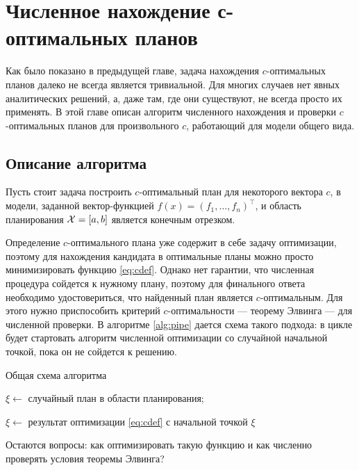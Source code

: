 \documentclass[specialist,
               substylefile = spbu.rtx,
               subf,href,colorlinks=true, 12pt]{disser}
\theoremstyle{definition}
\newcommand{\hm}[1]{#1\nobreak\discretionary{}{\hbox{\ensuremath{#1}}}{}}
\begin{document}
	
\chapter{Численное нахождение с-оптимальных планов}
\label{ch:num}
	Как было показано в предыдущей главе, задача нахождения $c$-оптимальных планов далеко не всегда является тривиальной. Для многих случаев нет явных аналитических решений, а, даже там, где они существуют, не всегда просто их применять. В этой главе описан алгоритм численного нахождения и проверки $c$-оптимальных планов для произвольного $c$, работающий для модели общего вида.
	\section{Описание алгоритма}
	Пусть стоит задача построить $c$-оптимальный план для некоторого вектора $c$, в модели, заданной вектор-функцией $f(x) = (f_1, \ldots, f_n)^\top$, и область планирования $\mathcal{X} \hm{=} [a, b]$ является конечным отрезком.
	
	Определение $c$-оптимального плана уже содержит в себе задачу оптимизации, поэтому для нахождения кандидата в оптимальные планы можно просто минимизировать функцию \eqref{eq:cdef}. Однако нет гарантии, что численная процедура сойдется к нужному плану, поэтому для финального ответа необходимо удостовериться, что  найденный план является $c$-оптимальным. Для этого нужно приспособить критерий $c$-оптимальности --- теорему Элвинга --- для численной проверки. В алгоритме \ref{alg:pipe} дается схема такого подхода: в цикле будет стартовать алгоритм численной оптимизации со случайной начальной точкой, пока он не сойдется к решению.
	\begin{algorithm}
	\caption{Общая схема алгоритма}
		\SetAlgoLined 
		\KwResult{$\xi$} 
		 {
			$\xi \leftarrow$ случайный план в области планирования;
			
			$\xi \leftarrow$ результат оптимизации  \eqref{eq:cdef} с начальной точкой $\xi$
		}
		\label{alg:pipe}
	\end{algorithm}

	Остаются вопросы: как оптимизировать такую функцию и как численно проверять условия теоремы Элвинга?
\end{document}
